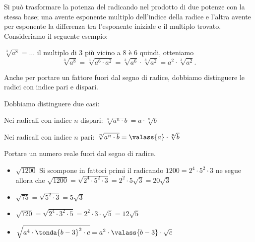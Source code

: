 Si può trasformare la potenza del radicando nel 
prodotto di due potenze con la stessa base; una avente esponente multiplo 
dell'indice della radice e l'altra avente per esponente la differenza tra 
l'esponente iniziale e il multiplo trovato. Consideriamo il seguente 
esempio:

\(\sqrt[3]{a^8}=\ldots \) il multiplo di \(3\) più vicino a \(8\) è \(6\) 
quindi, otteniamo
\[\sqrt[3]{a^8}=\sqrt[3]{a^6\cdot a^2}=\sqrt[3]{a^6}\cdot \sqrt[3]{a^2}=
a^2\cdot \sqrt[3]{a^2}.\]


Anche per portare un fattore fuori dal segno di radice, dobbiamo distinguere 
le radici con indice pari e dispari.
\begin{definizione}{}{}
Dobbiamo distinguere due casi:

Nei radicali con indice \(n\) dispari: \quad
\(\sqrt[n]{a^n \cdot b} = a \cdot \sqrt[n]{b}\)

Nei radicali con indice \(n\) pari: \quad
\(\sqrt[n]{a^n \cdot b} = \valass{a} \cdot \sqrt[n]{b}\)
\end{definizione}


% 
\begin{esempio}{}{}
Portare un numero reale fuori dal segno di radice.
\begin{itemize}
\item \(\sqrt{1200}\) Si scompone in fattori primi il radicando 
      \(1200=2^4\cdot 5^2\cdot 3\) ne segue allora che 
      \(\sqrt{1200}=\sqrt{2^4\cdot 5^2\cdot 3}=2^2\cdot 
5\sqrt{3}=20\sqrt{3}\)
\item \(\sqrt{75}=\sqrt{5^2\cdot 3}=5\sqrt{3}\)
\item \(\sqrt{720}=\sqrt{2^4\cdot 3^2\cdot 5}=
      2^2\cdot 3\cdot \sqrt 5=12\sqrt 5\)
\item \(\sqrt{a^4\cdot \tonda{b-3}^2\cdot c}=
      a^2 \cdot \valass{b-3} \cdot \sqrt c\)
\end{itemize}
\end{esempio}
% 

